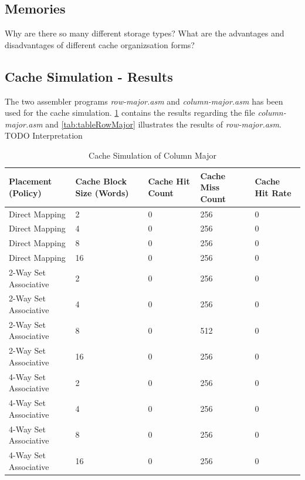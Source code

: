 
\subsection{Memories}

Why are there so many different storage types?
What are the advantages and disadvantages of different cache organizsation forms?



\subsection{Cache Simulation - Results}
The two assembler programs \textit{row-major.asm} and \textit{column-major.asm} has been used for the cache simulation. \ref{tab:tableColumnMajor} contains the results regarding the file \textit{column-major.asm} and \ref{tab:tableRowMajor} illustrates the results of \textit{row-major.asm}.\\
TODO Interpretation


\begin{table}
\centering
\caption{Cache Simulation of Column Major}
\label{tab:tableColumnMajor}
\begin{tabular}{lllll}
\hline %
Placement (Policy) & Cache Block Size (Words) & Cache Hit Count & Cache Miss Count & Cache Hit Rate \\
\hline %
Direct Mapping & 2 & 0 & 256 & 0  \\
Direct Mapping & 4 & 0 & 256 & 0  \\
Direct Mapping & 8 & 0 & 256 & 0  \\
Direct Mapping & 16 & 0 & 256 & 0  \\
2-Way Set Associative & 2 & 0 & 256 & 0 \\
2-Way Set Associative & 4 & 0 & 256 & 0 \\
2-Way Set Associative & 8 & 0 & 512 & 0 \\
2-Way Set Associative & 16 & 0 & 256 & 0 \\
4-Way Set Associative & 2 & 0 & 256 & 0 \\
4-Way Set Associative & 4 & 0 & 256 & 0 \\
4-Way Set Associative & 8 & 0 & 256 & 0 \\
4-Way Set Associative & 16 & 0 & 256 & 0 \\
\hline %
\end{tabular} 
\end{table}

